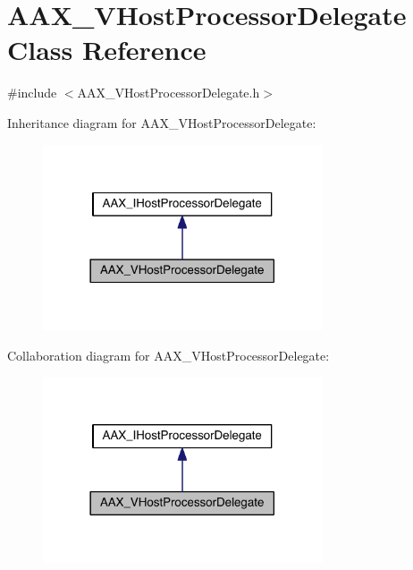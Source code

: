 \hypertarget{a00136}{}\section{A\+A\+X\+\_\+\+V\+Host\+Processor\+Delegate Class Reference}
\label{a00136}


{\ttfamily \#include $<$A\+A\+X\+\_\+\+V\+Host\+Processor\+Delegate.\+h$>$}



Inheritance diagram for A\+A\+X\+\_\+\+V\+Host\+Processor\+Delegate\+:
\nopagebreak
\begin{figure}[H]
\begin{center}
\leavevmode
\includegraphics[width=234pt]{a00704}
\end{center}
\end{figure}


Collaboration diagram for A\+A\+X\+\_\+\+V\+Host\+Processor\+Delegate\+:
\nopagebreak
\begin{figure}[H]
\begin{center}
\leavevmode
\includegraphics[width=234pt]{a00705}
\end{center}
\end{figure}


